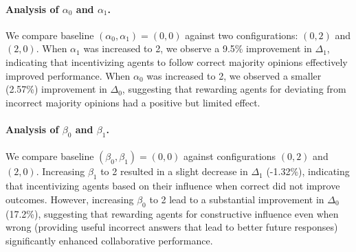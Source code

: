 \paragraph{Analysis of $\alpha_0$ and $\alpha_1$.}
We compare baseline $(\alpha_0, \alpha_1) = (0,0)$ against two configurations: $(0,2)$ and $(2,0)$. When $\alpha_1$ was increased to 2, we observe a 9.5\% improvement in $\Delta_1$, indicating that incentivizing agents to follow correct majority opinions effectively improved performance. When $\alpha_0$ was increased to 2, we observed a smaller (2.57\%) improvement in $\Delta_0$, suggesting that rewarding agents for deviating from incorrect majority opinions had a positive but limited effect.
\begin{table}[h]
    \centering
    \caption{Analysis of majority opinion influence under different $\beta$ parameters. Meaning of the column is the same as Table~\ref{tab:alpha_analysis}.
    }    \label{tab:beta_analysis}
\end{table}

\safevspace{-6mm}

\paragraph{Analysis of $\beta_0$ and $\beta_1$.}
We compare baseline $(\beta_0, \beta_1) = (0,0)$  against configurations $(0,2)$ and $(2,0)$. Increasing $\beta_1$ to 2 resulted in a slight decrease in $\Delta_1$ (-1.32\%), indicating that incentivizing agents based on their influence when correct did not improve outcomes. However, increasing $\beta_0$ to 2 lead to a substantial improvement in $\Delta_0$ (17.2\%), suggesting that rewarding agents for constructive influence even when wrong (providing useful incorrect answers that lead to better future responses) significantly enhanced collaborative performance.


